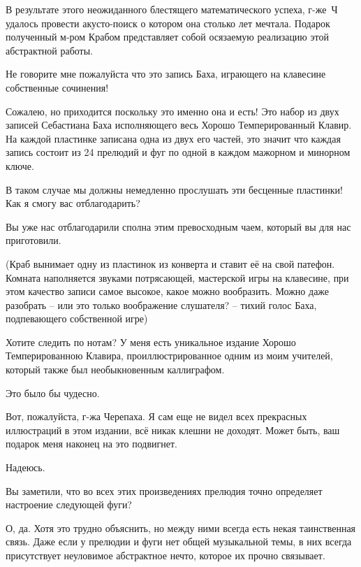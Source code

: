 \documentclass[../main.tex]{subfiles}
\begin{document}
\begin{dialogue}
 В результате этого неожиданного блестящего математического успеха, г-же~Ч удалось провести акусто-поиск о котором она столько лет мечтала. Подарок полученный м-ром Крабом представляет собой осязаемую реализацию этой абстрактной работы.

 Не говорите мне пожалуйста что это запись Баха, играющего на клавесине собственные сочинения!

 Сожалею, но приходится поскольку это именно она и есть! Это набор из двух записей Себастиана Баха исполняющего весь Хорошо Темперированный Клавир. На каждой пластинке записана одна из двух его частей, это значит что каждая запись состоит из 24 прелюдий и фуг по одной в каждом мажорном и минорном ключе.

 В таком случае мы должны немедленно прослушать эти бесценные пластинки! Как я смогу вас отблагодарить?

 Вы уже нас отблагодарили сполна этим превосходным чаем, который вы для нас приготовили.

(Краб вынимает одну из пластинок из конверта и ставит её на свой патефон. Комната наполняется звуками потрясающей, мастерской игры на клавесине, при этом качество записи самое высокое, какое можно вообразить. Можно даже разобрать \--- или это только воображение слушателя? \--- тихий голос Баха, подпевающего собственной игре)

 Хотите следить по нотам? У меня есть уникальное издание Хорошо Темперированною Клавира, проиллюстрированное одним из моим учителей, который также был необыкновенным каллиграфом.

 Это было бы чудесно.


 Вот, пожалуйста, г-жа Черепаха. Я сам еще не видел всех прекрасных иллюстраций в этом издании, всё никак клешни не доходят. Может быть, ваш подарок меня наконец на это подвигнет.

 Надеюсь.

 Вы заметили, что во всех этих произведениях прелюдия точно определяет настроение следующей фуги?

 О, да. Хотя это трудно объяснить, но между ними всегда есть некая таинственная связь. Даже если у прелюдии и фуги нет общей музыкальной темы, в них всегда присутствует неуловимое абстрактное нечто, которое их прочно связывает.


\end{dialogue}
\end{document}

